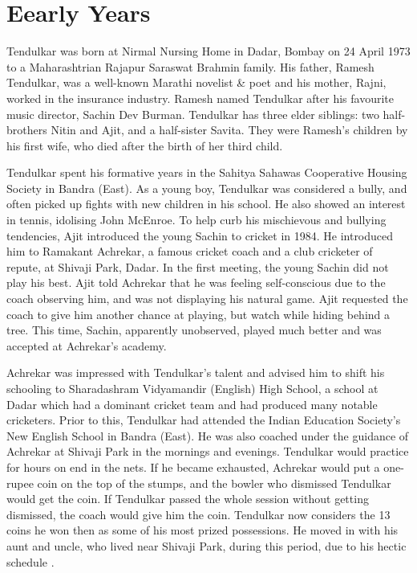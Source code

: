 \documentclass{report}
\begin{document}
\section{Eearly Years}
\begin{multicols}{2}
	Tendulkar was born at Nirmal Nursing Home in Dadar, Bombay on 24 April 1973 to a Maharashtrian Rajapur Saraswat Brahmin family. His father, Ramesh Tendulkar, was a well-known Marathi novelist \& poet and his mother, Rajni, worked in the insurance industry. Ramesh named Tendulkar after his favourite music director, Sachin Dev Burman. Tendulkar has three elder siblings: two half-brothers Nitin and Ajit, and a half-sister Savita. They were Ramesh's children by his first wife, who died after the birth of her third child.
	
	Tendulkar spent his formative years in the Sahitya Sahawas Cooperative Housing Society in Bandra (East). As a young boy, Tendulkar was considered a bully, and often picked up fights with new children in his school. He also showed an interest in tennis, idolising John McEnroe. To help curb his mischievous and bullying tendencies, Ajit introduced the young Sachin to cricket in 1984. He introduced him to Ramakant Achrekar, a famous cricket coach and a club cricketer of repute, at Shivaji Park, Dadar. In the first meeting, the young Sachin did not play his best. Ajit told Achrekar that he was feeling self-conscious due to the coach observing him, and was not displaying his natural game. Ajit requested the coach to give him another chance at playing, but watch while hiding behind a tree. This time, Sachin, apparently unobserved, played much better and was accepted at Achrekar's academy.
	
	Achrekar was impressed with Tendulkar's talent and advised him to shift his schooling to Sharadashram Vidyamandir (English) High School, a school at Dadar which had a dominant cricket team and had produced many notable cricketers. Prior to this, Tendulkar had attended the Indian Education Society's New English School in Bandra (East). He was also coached under the guidance of Achrekar at Shivaji Park in the mornings and evenings. Tendulkar would practice for hours on end in the nets. If he became exhausted, Achrekar would put a one-rupee coin on the top of the stumps, and the bowler who dismissed Tendulkar would get the coin. If Tendulkar passed the whole session without getting dismissed, the coach would give him the coin. Tendulkar now considers the 13 coins he won then as some of his most prized possessions. He moved in with his aunt and uncle, who lived near Shivaji Park, during this period, due to his hectic schedule \cite{sachinwiki}.
\end{multicols}

 

\end{document}
